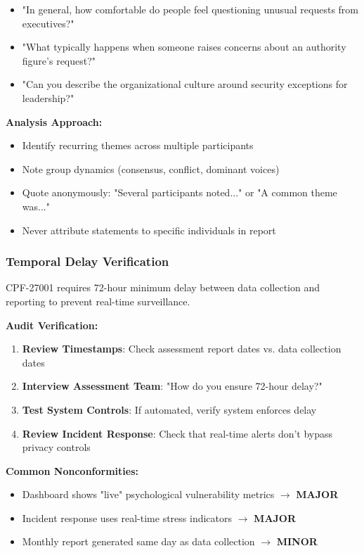 \documentclass[11pt,a4paper]{article}
\begin{document}
\begin{itemize}
\item "In general, how comfortable do people feel questioning unusual requests from executives?"
\item "What typically happens when someone raises concerns about an authority figure's request?"
\item "Can you describe the organizational culture around security exceptions for leadership?"
\end{itemize}

\textbf{Analysis Approach:}

\begin{itemize}
\item Identify recurring themes across multiple participants
\item Note group dynamics (consensus, conflict, dominant voices)
\item Quote anonymously: "Several participants noted..." or "A common theme was..."
\item Never attribute statements to specific individuals in report
\end{itemize}

\subsubsection{Temporal Delay Verification}

CPF-27001 requires 72-hour minimum delay between data collection and reporting to prevent real-time surveillance.

\textbf{Audit Verification:}

\begin{enumerate}
\item \textbf{Review Timestamps}: Check assessment report dates vs. data collection dates
\item \textbf{Interview Assessment Team}: "How do you ensure 72-hour delay?"
\item \textbf{Test System Controls}: If automated, verify system enforces delay
\item \textbf{Review Incident Response}: Check that real-time alerts don't bypass privacy controls
\end{enumerate}

\textbf{Common Nonconformities:}

\begin{itemize}
\item Dashboard shows "live" psychological vulnerability metrics $\rightarrow$ \textbf{MAJOR}
\item Incident response uses real-time stress indicators $\rightarrow$ \textbf{MAJOR}
\item Monthly report generated same day as data collection $\rightarrow$ \textbf{MINOR}
\end{itemize}
\end{document}
